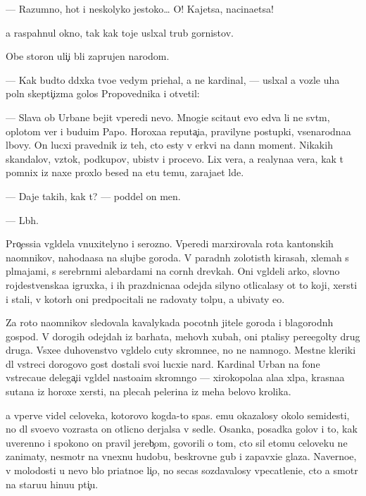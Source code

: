 \documentclass[10pt]{book}
\begin{document}
— Razumno, hot{\ia} i neskolyko jestoko… O! Kajetsa, nacina{\y}etsa!

{\Y}a raspahnul okno, tak kak toje usl{\yi}xal trub{\yi} gornistov.

Obe storon{\yi} uli{\c}i b{\yi}li zaprujen{\yi} narodom.

— Kak budto d{\ia}d{\io}xka tvo{\y}e{\y} vedym{\yi} pri{\y}ehal, a ne kardinal, — usl{\yi}xal {\y}a voz\-le uha poln{\yi}{\y} skepti{\c}izma golos Pro\-po\-ved\-nika i otvetil:

— Slava ob Urbane bejit vperedi nevo. Mnogi{\y}e scita{\y}ut {\y}evo {\y}edva li ne sv{\ia}\-t{\yi}m, oplotom ver{\yi} i budu{\x}im Papo{\y}. Horoxa{\y}a reputa{\c}i{\y}a, pravilyn{\yi}{\y}e postupki, vse\-narod\-na\-{\y}a l{\io}bovy. On lucxi{\y} pravednik iz teh, cto {\y}esty v {\C}erkvi na dann{\yi}{\y} moment. Nikakih skandalov, vz{\ia}tok, podkupov, ubi{\y}stv i procevo. Lix vera, a realyna{\y}a vera, kak t{\yi} pomnix iz naxe{\y} proxlo{\y} besed{\yi} na etu temu, zaraja{\y}et l{\io}de{\y}.

— Daje takih, kak t{\yi}? — poddel on men{\ia}.

— L{\io}b{\yi}h.

Pro{\c}essi{\y}a v{\yi}gl{\ia}dela vnuxitelyno i ser{\y}ozno. Vperedi marxirovala rota kantonskih na{\y}om\-ni\-kov, nahod{\ia}{\x}a{\y}asa na slujbe go\-ro\-da. V paradn{\yi}h zolotist{\yi}h kirasah, xlemah s pl{\io}majami, s serebr{\ia}n{\yi}mi alebardami na corn{\yi}h drevkah. Oni v{\yi}gl{\ia}deli {\y}arko, slovno rojdestvenska{\y}a igruxka, i ih prazdnicna{\y}a odejda silyno otlicalasy ot to{\y} koji, xersti i stali, v kotor{\yi}h oni predpocitali ne radovaty tolpu, a ubivaty {\y}e{\y}o.

Za roto{\y} na{\y}om\-ni\-kov sledovala kavalykada pocotn{\yi}h jitele{\y} go\-ro\-da i blago\-rod\-n{\yi}h gospod. V dorogih odejdah iz barhata, mehov{\yi}h xubah, oni p{\yi}talisy pere\-{\x}e\-go\-l{\ia}ty drug druga. V{\yi}sxe{\y}e duhovenstvo v{\yi}gl{\ia}delo cuty skromne{\y}e, no ne namnogo. Mestn{\yi}{\y}e kleriki dl{\ia} vstreci dorogovo gost{\ia} dostali svo{\y}i lucxi{\y}e nar{\ia}d{\yi}. Kardinal Urban na fone vstreca{\y}u{\x}e{\y} delega{\c}i{\y}i v{\yi}gl{\ia}del nasto{\y}a{\x}im skromn{\ia}go{\y} — xirokopola{\y}a ala{\y}a xl{\ia}pa, krasna{\y}a sutana iz horoxe{\y} xersti, na plecah pelerina iz meha belovo krolika.

{\Y}a vperv{\yi}{\y}e videl celoveka, kotorovo kogda-to spas. {\Y}emu okazalosy okolo semi\-des{\ia}\-ti, no dl{\ia} svo{\y}evo vozrasta on otlicno derjalsa v sedle. Osanka, posadka golov{\yi} i to, kak uverenno i spo\-ko{\y}\-no on pravil jereb{\c}om, govorili o tom, cto sil etomu celoveku ne zanimaty, ne\-smo\-tr{\ia} na vnexn{\io}{\y}u hudobu, beskrovn{\yi}{\y}e gub{\yi} i zapavxi{\y}e glaza. Naverno{\y}e, v molodosti u nevo b{\yi}lo pri{\y}atno{\y}e li{\c}o, no se{\y}cas sozdavalosy vpe\-catle\-ni\-{\y}e, cto {\y}a smotr{\io} na staru{\y}u hi{\x}nu{\y}u pti{\c}u.
\end{document}
